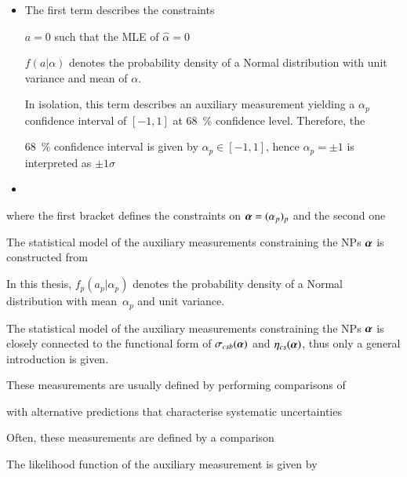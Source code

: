 \begin{itemize}

\item

  The first term describes the constraints

  $a = 0$ such that the MLE of $\hat{\alpha} = 0$

  $f(a \vert \alpha)$ denotes the probability density of a Normal distribution
  with unit variance and mean of $\alpha$.

  In isolation, this term describes an auxiliary measurement yielding a
  $\alpha_p$ confidence interval of $[-1, 1]$ at \SI{68}{\percent} confidence
  level. Therefore, the

  \SI{68}{\percent} confidence interval is given by $\alpha_p \in [-1, 1]$,
  hence $\alpha_p = \pm 1$ is interpreted as $\pm 1 \sigma$

\item

\end{itemize}


where the first bracket defines the constraints on
$\myvec{\alpha} = (\alpha_p)_p$ and the second one



The statistical model of
the auxiliary measurements constraining the NPs $\myvec{\alpha}$ is constructed
from





In this thesis, $f_p(a_p \vert \alpha_p)$ denotes the probability density of a
Normal distribution with mean~$\alpha_p$ and unit variance.




The statistical model of the auxiliary measurements constraining the NPs
$\myvec{\alpha}$ is closely connected to the functional form of
$\sigma_{csb}(\myvec{\alpha})$ and $\eta_{cs}(\myvec{\alpha})$, thus only a
general introduction is given.



These measurements are usually defined by performing comparisons of


with alternative predictions that characterise systematic uncertainties


Often, these
measurements are defined by a comparison


The likelihood function of the auxiliary measurement is given by

\vspace{5em}

